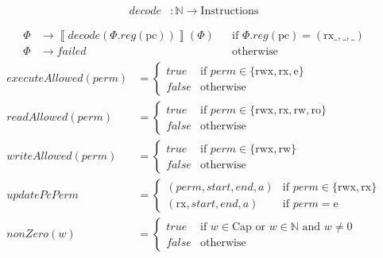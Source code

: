 \documentclass{article}
\newcommand{\pcreg}{\mathrm{pc}}
\newcommand{\addr}{a}
\newcommand{\start}{start}
\newcommand{\addrend}{end}
\newcommand{\reg}{reg}
\newcommand{\perm}{perm}
\newcommand{\failed}{\mathit{failed}}
\newcommand{\false}{\mathit{false}}
\newcommand{\true}{\mathit{true}}
\newcommand{\plainfun}[1]{\mathit{#1}}
\newcommand{\decode}{\plainfun{decode}}
\newcommand{\updatePcPerm}[1]{\plainfun{updatePcPerm}}
\newcommand{\executeAllowed}[1]{\plainfun{executeAllowed}(#1)}
\newcommand{\nonZero}[1]{\plainfun{nonZero}(#1)}
\newcommand{\readAllowed}[1]{\plainfun{readAllowed}(#1)}
\newcommand{\writeAllowed}[1]{\plainfun{writeAllowed}(#1)}
\newcommand{\plaindom}[1]{\mathrm{#1}}
\newcommand{\Caps}{\plaindom{Cap}}
\newcommand{\Instrs}{\plaindom{Instructions}}
\newcommand{\nats}{\mathbb{N}}
\newcommand{\plainperm}[1]{\mathrm{#1}}
\newcommand{\readonly}{\plainperm{ro}}
\newcommand{\readwrite}{\plainperm{rw}}
\newcommand{\exec}{\plainperm{rx}}
\newcommand{\entry}{\plainperm{e}}
\newcommand{\rwx}{\plainperm{rwx}}
\newcommand{\sem}[1]{\left\llbracket #1 \right\rrbracket}
\begin{document}
\begin{align*}
\decode &:\nats \rightarrow \Instrs
\end{align*}

\begin{align*}
\Phi & \rightarrow \sem{\decode(\Phi.\reg(\pcreg))}(\Phi) & & \text{if $\Phi.\reg(\pcreg) = (\exec{\_},{\_},{\_})$} \\
\Phi & \rightarrow \failed                                      & & \text{otherwise}
\end{align*}
\begin{align*}
  \executeAllowed{\perm} &=
                           \begin{cases}
                             \true & \text{if } \perm \in \{ \rwx, \exec, \entry \} \\
                             \false & \text{otherwise}
                           \end{cases} \\
  \readAllowed{\perm} &=
                           \begin{cases}
                             \true & \text{if } \perm \in \{ \rwx, \exec, \readwrite, \readonly \} \\
                             \false & \text{otherwise}
                           \end{cases} \\
  \writeAllowed{\perm} &=
                           \begin{cases}
                             \true & \text{if } \perm \in \{ \rwx, \readwrite\} \\
                             \false & \text{otherwise}
                           \end{cases} \\
  \updatePcPerm{\perm,\start,\addrend,\addr} &=
                                     \begin{cases}
                                       (\perm,\start,\addrend,\addr) & \text{if $\perm\in\{ \rwx, \exec \}$} \\
                                       (\exec,\start,\addrend,\addr) & \text{if $\perm = \entry$}
                                     \end{cases} \\
  \nonZero{w} &=
                \begin{cases}
                  \true & \text{if $w\in \Caps$ or $w\in \nats$ and $w \neq 0$}\\
                  \false & \text{otherwise}
                \end{cases}
\end{align*}
\end{document}
